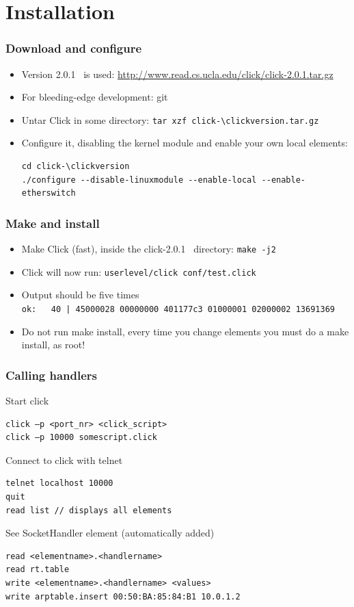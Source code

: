 \documentclass{beamer}
\newcommand{\clickversion}{2.0.1}
\begin{document}
\section{Installation}
\begin{frame}[fragile]
\frametitle{Download and configure}
\begin{itemize}
	\item Version \clickversion~ is used: \url{http://www.read.cs.ucla.edu/click/click-\clickversion.tar.gz }
	\item For bleeding-edge development: git
	\item Untar Click in some directory: \lstinline!tar xzf click-\clickversion.tar.gz!
	\item Configure it, disabling the kernel module and enable your own local elements:
	\begin{lstlisting}
cd click-\clickversion
./configure --disable-linuxmodule --enable-local --enable-etherswitch
\end{lstlisting}
\end{itemize}

\end{frame}
\begin{frame}[fragile]
	\frametitle{Make and install}
\begin{itemize}
	\item Make Click (fast), inside the click-\clickversion~ directory: \lstinline!make -j2!
	\item Click will now run: \lstinline!userlevel/click conf/test.click!
	\item Output should be five times \\ \lstinline!ok:   40 | 45000028 00000000 401177c3 01000001 02000002 13691369!
	\item Do not run make install, every time you change elements you must do a make install, as root!
\end{itemize}	
\end{frame}

\begin{frame}[fragile]
	\frametitle{Calling handlers}
Start click
\begin{verbatim}
click –p <port_nr> <click_script>
click –p 10000 somescript.click
\end{verbatim}
Connect to click with telnet
\begin{verbatim}
telnet localhost 10000
quit
read list // displays all elements
\end{verbatim}
See SocketHandler element (automatically added)
\begin{verbatim}
read <elementname>.<handlername>
read rt.table
write <elementname>.<handlername> <values>
write arptable.insert 00:50:BA:85:84:B1 10.0.1.2
\end{verbatim}
\end{frame}
\end{document}
